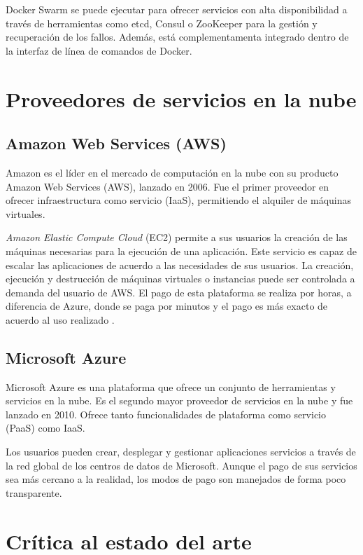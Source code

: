 \documentclass[11pt,spanish,listoffigures]{tfgetsinf}
\begin{document}
Docker Swarm se puede ejecutar para ofrecer servicios con alta disponibilidad a través de herramientas como etcd, Consul o ZooKeeper para la gestión y recuperación de los fallos. Además, está complementamenta integrado dentro de la interfaz de línea de comandos de Docker.

\section{Proveedores de servicios en la nube}

\subsection{Amazon Web Services (AWS)}
Amazon es el líder en el mercado de computación en la nube con su producto Amazon Web Services (AWS), lanzado en 2006. Fue el primer proveedor en ofrecer infraestructura como servicio (IaaS), permitiendo el alquiler de máquinas virtuales.

\textit{Amazon Elastic Compute Cloud} (EC2) permite a sus usuarios la creación de las máquinas necesarias para la ejecución de una aplicación. Este servicio es capaz de escalar las aplicaciones de acuerdo a las necesidades de sus usuarios. La creación, ejecución y destrucción de máquinas virtuales o instancias puede ser controlada a demanda del usuario de AWS. El pago de esta plataforma se realiza por horas, a diferencia de Azure, donde se paga por minutos y el pago es más exacto de acuerdo al uso realizado \cite{Qaisi2016}.

\subsection{Microsoft Azure}

Microsoft Azure \cite{Qaisi2016} es una plataforma que ofrece un conjunto de herramientas y servicios en la nube. Es el segundo mayor proveedor de servicios en la nube y fue lanzado en 2010. Ofrece tanto funcionalidades de plataforma como servicio (PaaS) como IaaS.

Los usuarios pueden crear, desplegar y gestionar aplicaciones  servicios a través de la red global de los centros de datos de Microsoft. Aunque el pago de sus servicios sea más cercano a la realidad, los modos de pago son manejados de forma poco transparente.

\section{Crítica al estado del arte}
\end{document}
